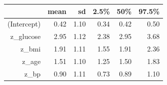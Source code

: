 \begin{table}[ht]
\centering
\begin{tabular}{rrrrrr}
  \hline
 & mean & sd & 2.5\% & 50\% & 97.5\% \\ 
  \hline
(Intercept) & 0.42 & 1.10 & 0.34 & 0.42 & 0.50 \\ 
  z\_glucose & 2.95 & 1.12 & 2.38 & 2.95 & 3.68 \\ 
  z\_bmi & 1.91 & 1.11 & 1.55 & 1.91 & 2.36 \\ 
  z\_age & 1.51 & 1.10 & 1.25 & 1.50 & 1.83 \\ 
  z\_bp & 0.90 & 1.11 & 0.73 & 0.89 & 1.10 \\ 
   \hline
\end{tabular}
\end{table}
